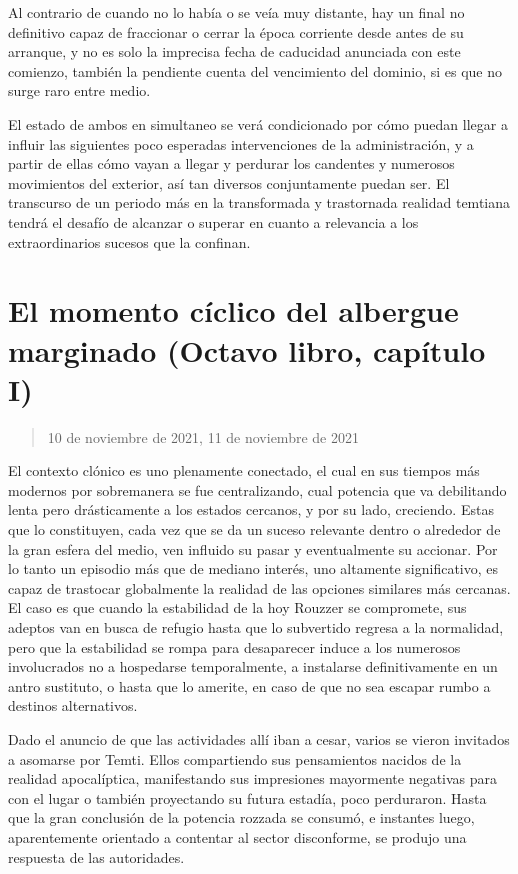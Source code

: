 \documentclass[
  spanish,
]{book}
\begin{document}
Al contrario de cuando no lo había o se veía muy distante, hay un final no definitivo capaz de fraccionar o cerrar la época corriente desde antes de su arranque, y no es solo la imprecisa fecha de caducidad anunciada con este comienzo, también la pendiente cuenta del vencimiento del dominio, si es que no surge raro entre medio.

El estado de ambos en simultaneo se verá condicionado por cómo puedan llegar a influir las siguientes poco esperadas intervenciones de la administración, y a partir de ellas cómo vayan a llegar y perdurar los candentes y numerosos movimientos del exterior, así tan diversos conjuntamente puedan ser. El transcurso de un periodo más en la transformada y trastornada realidad temtiana tendrá el desafío de alcanzar o superar en cuanto a relevancia a los extraordinarios sucesos que la confinan.

\hypertarget{el-momento-cuxedclico-del-albergue-marginado-octavo-libro-capuxedtulo-i}{%
\section{El momento cíclico del albergue marginado (Octavo libro, capítulo I)}\label{el-momento-cuxedclico-del-albergue-marginado-octavo-libro-capuxedtulo-i}}

\begin{quote}
10 de noviembre de 2021, 11 de noviembre de 2021
\end{quote}

El contexto clónico es uno plenamente conectado, el cual en sus tiempos más modernos por sobremanera se fue centralizando, cual potencia que va debilitando lenta pero drásticamente a los estados cercanos, y por su lado, creciendo. Estas que lo constituyen, cada vez que se da un suceso relevante dentro o alrededor de la gran esfera del medio, ven influido su pasar y eventualmente su accionar. Por lo tanto un episodio más que de mediano interés, uno altamente significativo, es capaz de trastocar globalmente la realidad de las opciones similares más cercanas. El caso es que cuando la estabilidad de la hoy Rouzzer se compromete, sus adeptos van en busca de refugio hasta que lo subvertido regresa a la normalidad, pero que la estabilidad se rompa para desaparecer induce a los numerosos involucrados no a hospedarse temporalmente, a instalarse definitivamente en un antro sustituto, o hasta que lo amerite, en caso de que no sea escapar rumbo a destinos alternativos.

Dado el anuncio de que las actividades allí iban a cesar, varios se vieron invitados a asomarse por Temti. Ellos compartiendo sus pensamientos nacidos de la realidad apocalíptica, manifestando sus impresiones mayormente negativas para con el lugar o también proyectando su futura estadía, poco perduraron. Hasta que la gran conclusión de la potencia rozzada se consumó, e instantes luego, aparentemente orientado a contentar al sector disconforme, se produjo una respuesta de las autoridades.
\end{document}
